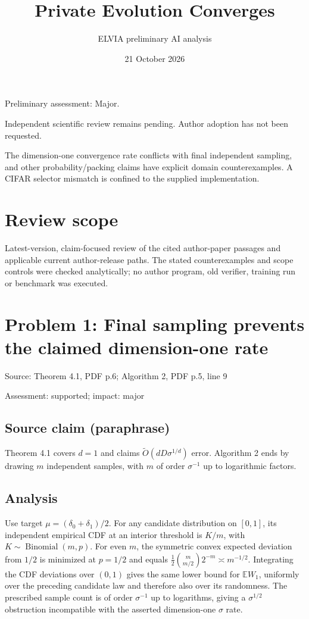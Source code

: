 \documentclass[11pt]{article}
\begin{document}
\title{Private Evolution Converges}

\author{ELVIA preliminary AI analysis}\date{21 October 2026}\maketitle

Preliminary assessment: Major.\par

Independent scientific review remains pending. Author adoption has not been requested.

The dimension-one convergence rate conflicts with final independent sampling, and other probability/packing claims have explicit domain counterexamples. A CIFAR selector mismatch is confined to the supplied implementation.

\section*{Review scope}

Latest-version, claim-focused review of the cited author-paper passages and applicable current author-release paths. The stated counterexamples and scope controls were checked analytically; no author program, old verifier, training run or benchmark was executed.

\section*{Problem 1: Final sampling prevents the claimed dimension-one rate}

Source: Theorem 4.1, PDF p.6; Algorithm 2, PDF p.5, line 9

Assessment: supported; impact: major

\subsection*{Source claim (paraphrase)}

Theorem 4.1 covers \(d=1\) and claims \(\widetilde O(dD\sigma^{1/d})\) error. Algorithm 2 ends by drawing \(m\) independent samples, with \(m\) of order \(\sigma^{-1}\) up to logarithmic factors.

\subsection*{Analysis}

Use target \(\mu=(\delta_0+\delta_1)/2\). For any candidate distribution on \([0,1]\), its independent empirical CDF at an interior threshold is \(K/m\), with \(K\sim\operatorname{Binomial}(m,p)\). For even \(m\), the symmetric convex expected deviation from \(1/2\) is minimized at \(p=1/2\) and equals \(\tfrac12\binom{m}{m/2}2^{-m}\asymp m^{-1/2}\). Integrating the CDF deviations over \((0,1)\) gives the same lower bound for \(\mathbb E W_1\), uniformly over the preceding candidate law and therefore also over its randomness. The prescribed sample count is of order \(\sigma^{-1}\) up to logarithms, giving a \(\sigma^{1/2}\) obstruction incompatible with the asserted dimension-one \(\sigma\) rate.
\end{document}
